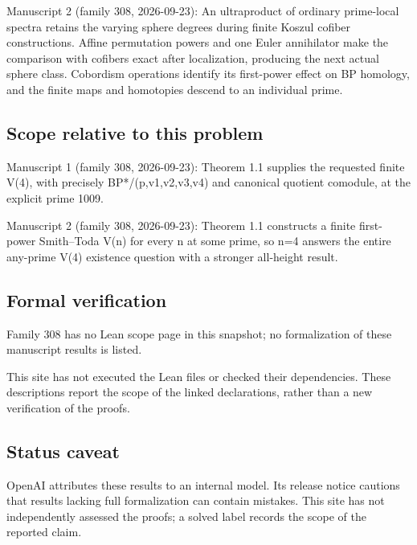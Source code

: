 \documentclass[11pt]{article}
\begin{document}
Manuscript 2 (family 308, 2026-09-23): An ultraproduct of ordinary prime-local spectra retains the varying sphere degrees during finite Koszul cofiber constructions. Affine permutation powers and one Euler annihilator make the comparison with cofibers exact after localization, producing the next actual sphere class. Cobordism operations identify its first-power effect on BP homology, and the finite maps and homotopies descend to an individual prime.

\subsection{Scope relative to this problem}
Manuscript 1 (family 308, 2026-09-23): Theorem 1.1 supplies the requested finite V(4), with precisely BP*/(p,v1,v2,v3,v4) and canonical quotient comodule, at the explicit prime 1009.

Manuscript 2 (family 308, 2026-09-23): Theorem 1.1 constructs a finite first-power Smith–Toda V(n) for every n at some prime, so n=4 answers the entire any-prime V(4) existence question with a stronger all-height result.

\subsection{Formal verification}
Family 308 has no Lean scope page in this snapshot; no formalization of these manuscript results is listed.

This site has not executed the Lean files or checked their dependencies. These descriptions report the scope of the linked declarations, rather than a new verification of the proofs.

\subsection{Status caveat}
OpenAI attributes these results to an internal model. Its release notice cautions that results lacking full formalization can contain mistakes. This site has not independently assessed the proofs; a solved label records the scope of the reported claim.
\end{document}

